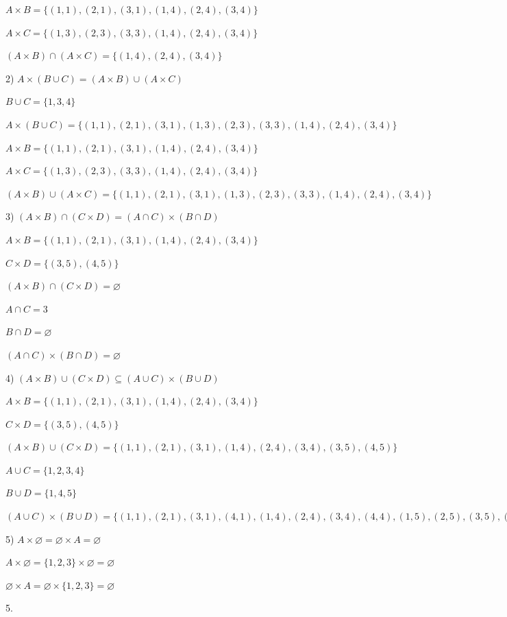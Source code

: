 \documentclass{article}
\newcommand{\vs}{\vspace{30pt}}
\begin{document}
$A \times B = \{(1,1), (2,1), (3,1), (1,4), (2,4), (3,4)\}$

$A \times C = \{(1,3), (2,3), (3,3), (1,4), (2,4), (3,4)\}$

$(A \times B) \cap (A \times C) = \{(1,4), (2,4), (3,4)\}$

2) $A \times (B \cup C) = (A \times B) \cup (A \times C)$

$B \cup C = \{1,3,4\}$

$A \times (B \cup C) = \{(1, 1), (2, 1), (3, 1), (1, 3), (2, 3), (3, 3), (1, 4), (2, 4), (3, 4)\}$

$A \times B = \{(1,1), (2,1), (3,1), (1,4), (2,4), (3,4)\}$

$A \times C = \{(1,3), (2,3), (3,3), (1,4), (2,4), (3,4)\}$

$(A \times B) \cup (A \times C) = \{(1,1), (2,1), (3,1), (1,3), (2,3), (3,3), (1,4), (2,4), (3,4)\}$

3) $(A \times B) \cap (C \times D) = (A \cap C) \times (B \cap D)$

$A \times B = \{(1,1), (2,1), (3,1), (1,4), (2,4), (3,4)\}$

$C \times D = \{(3,5), (4,5)\}$

$(A \times B) \cap (C \times D) = \varnothing$

$A \cap C = {3}$

$B \cap D = \varnothing$

$(A \cap C) \times (B \cap D) = \varnothing$

4) $(A \times B) \cup (C \times D) \subseteq (A \cup C) \times (B \cup D)$

$A \times B = \{(1,1), (2,1), (3,1), (1,4), (2,4), (3,4)\}$

$C \times D = \{(3,5), (4,5)\}$

$(A \times B) \cup (C \times D) = \{(1,1), (2,1), (3,1), (1,4), (2,4), (3,4), (3,5), (4,5)\}$

$A \cup C = \{1,2,3,4\}$

$B \cup D = \{1,4,5\}$

$(A \cup C) \times (B \cup D) = \{(1,1),(2,1),(3,1),(4,1),(1,4),(2,4),(3,4),(4,4),(1,5),(2,5),(3,5),(4,5)\}$

5) $A \times \varnothing = \varnothing \times A = \varnothing$

$A \times \varnothing = \{1,2,3\} \times \varnothing = \varnothing$

$\varnothing \times A = \varnothing \times \{1,2,3\} =  \varnothing$
\vs

5.
\end{document}
